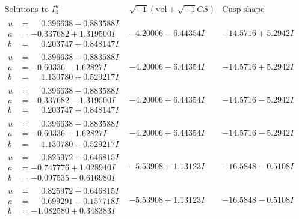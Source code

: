 \documentclass[1p]{elsarticle_modified}
\theoremstyle{definition}
\newcommand{\I}{\sqrt{-1}}
\begin{document}
$$\begin{array}{c|c|c}  
\text{Solutions to }I^u_{4}& \I (\text{vol} + \sqrt{-1}CS) & \text{Cusp shape}\\
 \hline 
\begin{aligned}
u &= \phantom{-}0.396638 + 0.883588 I \\
a &= -0.337682 + 1.319500 I \\
b &= \phantom{-}0.203747 - 0.848147 I\end{aligned}
 & -4.20006 - 6.44354 I & -14.5716 + 5.2942 I \\ \hline\begin{aligned}
u &= \phantom{-}0.396638 + 0.883588 I \\
a &= -0.60336 - 1.62827 I \\
b &= \phantom{-}1.130780 + 0.529217 I\end{aligned}
 & -4.20006 - 6.44354 I & -14.5716 + 5.2942 I \\ \hline\begin{aligned}
u &= \phantom{-}0.396638 - 0.883588 I \\
a &= -0.337682 - 1.319500 I \\
b &= \phantom{-}0.203747 + 0.848147 I\end{aligned}
 & -4.20006 + 6.44354 I & -14.5716 - 5.2942 I \\ \hline\begin{aligned}
u &= \phantom{-}0.396638 - 0.883588 I \\
a &= -0.60336 + 1.62827 I \\
b &= \phantom{-}1.130780 - 0.529217 I\end{aligned}
 & -4.20006 + 6.44354 I & -14.5716 - 5.2942 I \\ \hline\begin{aligned}
u &= \phantom{-}0.825972 + 0.646815 I \\
a &= -0.747776 + 1.028940 I \\
b &= -0.097535 - 0.616980 I\end{aligned}
 & -5.53908 + 1.13123 I & -16.5848 - 0.5108 I \\ \hline\begin{aligned}
u &= \phantom{-}0.825972 + 0.646815 I \\
a &= \phantom{-}0.699291 - 0.157718 I \\
b &= -1.082580 + 0.348383 I\end{aligned}
 & -5.53908 + 1.13123 I & -16.5848 - 0.5108 I \\ \hline\begin{aligned}

\end{aligned}
\end{array}$$
\end{document}
